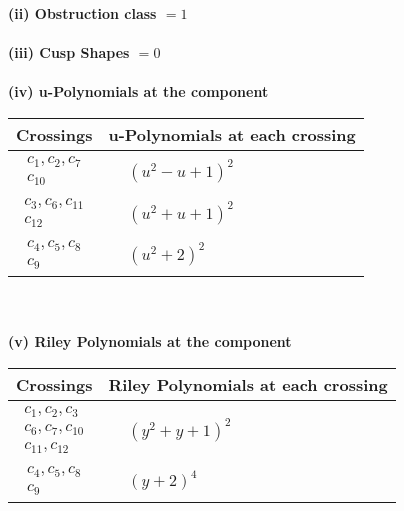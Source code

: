 \documentclass[1p]{elsarticle_modified}
\theoremstyle{definition}
\begin{document}
\flushleft \textbf{(ii) Obstruction class $= 1$}\\~\\
\flushleft \textbf{(iii) Cusp Shapes $= 0$}\\~\\
\newpage\renewcommand{\arraystretch}{1}
\flushleft \textbf{(iv) u-Polynomials at the component}\newline \\
\begin{tabular}{m{50pt}|m{274pt}}
Crossings & \hspace{64pt}u-Polynomials at each crossing \\
\hline $$\begin{aligned}c_{1},c_{2},c_{7}\\c_{10}\end{aligned}$$&$\begin{aligned}
&(u^2- u+1)^2
\end{aligned}$\\
\hline $$\begin{aligned}c_{3},c_{6},c_{11}\\c_{12}\end{aligned}$$&$\begin{aligned}
&(u^2+u+1)^2
\end{aligned}$\\
\hline $$\begin{aligned}c_{4},c_{5},c_{8}\\c_{9}\end{aligned}$$&$\begin{aligned}
&(u^2+2)^2
\end{aligned}$\\
\hline
\end{tabular}\\~\\
\newpage\renewcommand{\arraystretch}{1}
\flushleft \textbf{(v) Riley Polynomials at the component}\newline \\
\begin{tabular}{m{50pt}|m{274pt}}
Crossings & \hspace{64pt}Riley Polynomials at each crossing \\
\hline $$\begin{aligned}c_{1},c_{2},c_{3}\\c_{6},c_{7},c_{10}\\c_{11},c_{12}\end{aligned}$$&$\begin{aligned}
&(y^2+y+1)^2
\end{aligned}$\\
\hline $$\begin{aligned}c_{4},c_{5},c_{8}\\c_{9}\end{aligned}$$&$\begin{aligned}
&(y+2)^4
\end{aligned}$\\
\hline
\end{tabular}\\~\\
\end{document}

